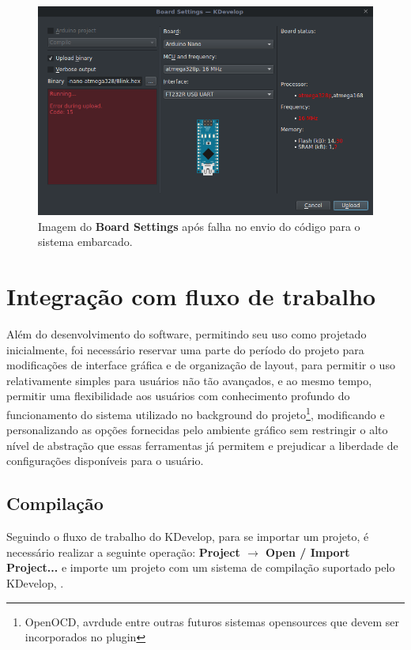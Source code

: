 \begin{figure}[!htb]
  \centering
  \caption[Board Settings com falha no envio]{Imagem do \textbf{Board Settings} após falha no envio do código para o sistema embarcado.}
  \label{fig:boardsettingsndone}
  \includegraphics[width=1\textwidth]{figuras/boardsettingsndone.png}
\end{figure}

\section{Integração com fluxo de trabalho}
Além do desenvolvimento do software, permitindo seu uso como projetado inicialmente, foi necessário reservar uma parte do período do projeto para modificações de interface gráfica e de organização de layout, para permitir o uso relativamente simples para usuários não tão avançados, e ao mesmo tempo, permitir uma flexibilidade aos usuários com conhecimento profundo do funcionamento do sistema utilizado no background do projeto\footnote{OpenOCD, avrdude entre outras futuros sistemas opensources que devem ser incorporados no plugin}, modificando e personalizando as opções fornecidas pelo ambiente gráfico sem restringir o alto nível de abstração que essas ferramentas já permitem e prejudicar a liberdade de configurações disponíveis para o usuário.

\subsection{Compilação}

Seguindo o fluxo de trabalho do KDevelop, para se importar um projeto, é necessário realizar a seguinte operação: \textbf{Project $\rightarrow$ Open / Import Project...} e importe um projeto com um sistema de compilação suportado pelo KDevelop, .


